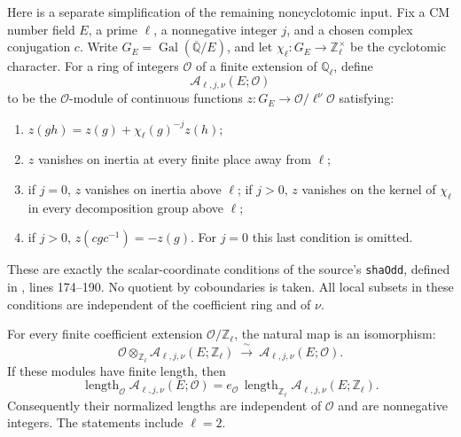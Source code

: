 Here is a separate simplification of the remaining noncyclotomic
input. Fix a CM number field \(E\), a prime \(\ell\), a nonnegative
integer \(j\), and a chosen complex conjugation \(c\). Write
\(G_E=\operatorname{Gal}(\overline{\mathbb Q}/E)\), and let
\(\chi_\ell:G_E\longrightarrow\mathbb Z_\ell^\times\) be the cyclotomic
character. For a ring of integers \(\mathcal O\) of a finite extension
of \(\mathbb Q_\ell\), define
\[
 \mathcal A_{\ell,j,\nu}(E;\mathcal O)
\]
to be the \(\mathcal O\)-module of continuous functions
\(z:G_E\to\mathcal O/\ell^\nu\mathcal O\) satisfying:
\begin{enumerate}
\item \(z(gh)=z(g)+\chi_\ell(g)^{-j}z(h)\);
\item \(z\) vanishes on inertia at every finite place away from \(\ell\);
\item if \(j=0\), \(z\) vanishes on inertia above \(\ell\); if \(j>0\),
      \(z\) vanishes on the kernel of \(\chi_\ell\) in every
      decomposition group above \(\ell\);
\item if \(j>0\), \(z(cgc^{-1})=-z(g)\). For \(j=0\) this last
      condition is omitted.
\end{enumerate}
These are exactly the scalar-coordinate conditions of the source's
\texttt{shaOdd}, defined in
, lines 174--190.
No quotient by coboundaries is taken. All local subsets in these
conditions are independent of the coefficient ring and of \(\nu\).

\begin{theorem}
\label{thm:sha-basechange}
For every finite coefficient extension \(\mathcal O/\mathbb Z_\ell\),
the natural map is an isomorphism:
\[
 \mathcal O\otimes_{\mathbb Z_\ell}
      \mathcal A_{\ell,j,\nu}(E;\mathbb Z_\ell)
 \ \xrightarrow{\ \sim\ }\
      \mathcal A_{\ell,j,\nu}(E;\mathcal O).
\]
If these modules have finite length, then
\[
 \operatorname{length}_{\mathcal O}
      \mathcal A_{\ell,j,\nu}(E;\mathcal O)
 =
 e_{\mathcal O}\,
 \operatorname{length}_{\mathbb Z_\ell}
      \mathcal A_{\ell,j,\nu}(E;\mathbb Z_\ell).
\]
Consequently their normalized lengths are independent of
\(\mathcal O\) and are nonnegative integers. The statements include
\(\ell=2\).
\end{theorem}

